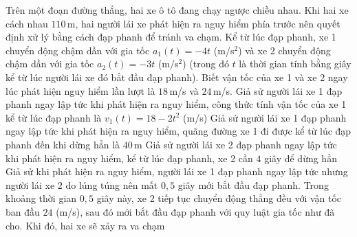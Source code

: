 \begin{ex}%
	Trên một đoạn đường thẳng, hai xe ô tô đang chạy ngược chiều nhau. Khi hai xe cách nhau $110$\,m, hai người lái xe phát hiện ra nguy hiểm phía trước nên quyết định xử lý bằng cách đạp phanh để tránh va chạm. Kể từ lúc đạp phanh, xe 1 chuyển động chậm dần với gia tốc $a_1(t) = -4t$ (m/s$^2$) và xe 2 chuyển động chậm dần với gia tốc $a_2(t) = -3t$ (m/s$^2$) (trong đó $t$ là thời gian tính bằng giây kể từ lúc người lái xe đó bắt đầu đạp phanh). Biết vận tốc của xe 1 và xe 2 ngay lúc phát hiện nguy hiểm lần lượt là $18$\,m/s và $24$\,m/s.
	\choiceTF
		{\True Giả sử người lái xe 1 đạp phanh ngay lập tức khi phát hiện ra nguy hiểm, công thức tính vận tốc của xe 1 kể từ lúc đạp phanh là $v_1(t) = 18 - 2t^2$ (m/s)}
		{Giả sử người lái xe 1 đạp phanh ngay lập tức khi phát hiện ra nguy hiểm, quãng đường xe 1 đi được kể từ lúc đạp phanh đến khi dừng hẳn là $40$\,m}
		{\True Giả sử người lái xe 2 đạp phanh ngay lập tức khi phát hiện ra nguy hiểm, kể từ lúc đạp phanh, xe 2 cần $4$ giây để dừng hẳn}
		{\True Giả sử khi phát hiện ra nguy hiểm, người lái xe 1 đạp phanh ngay lập tức nhưng người lái xe 2 do lúng túng nên mất $0{,}5$ giây mới bắt đầu đạp phanh. Trong khoảng thời gian $0{,}5$ giây này, xe 2 tiếp tục chuyển động thẳng đều với vận tốc ban đầu $24$ (m/s), sau đó mới bắt đầu đạp phanh với quy luật gia tốc như đã cho. Khi đó, hai xe sẽ xảy ra va chạm}
\end{ex}
